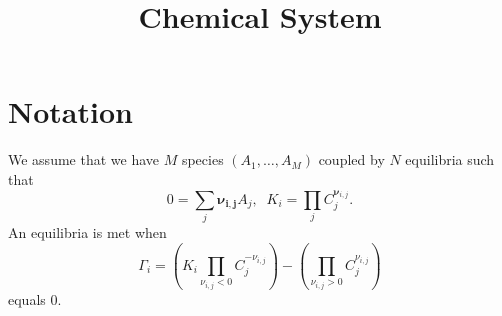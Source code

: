 \documentclass[aps]{revtex4}
\newcommand{\mymat}[1]{\boldsymbol{#1}}
\begin{document}
\title{Chemical System}
\maketitle

\section{Notation}
We assume that we have $M$ species $(A_1,\ldots,A_M)$ coupled
by $N$ equilibria such that
\begin{equation}
	0 = \sum_j \mymat{\nu_{i,j}} A_j,\;\; K_i = \prod_j C_j^{\mymat{\nu}_{i,j}}.
\end{equation}
An equilibria is met when
\begin{equation}
	\Gamma_i = \left(K_i \prod_{\nu_{i,j}<0} C_j^{-\nu_{i,j}}\right) - \left(\prod_{\nu_{i,j}>0} C_j^{\nu_{i,j}}\right)
\end{equation}
equals $0$.
\end{document}
